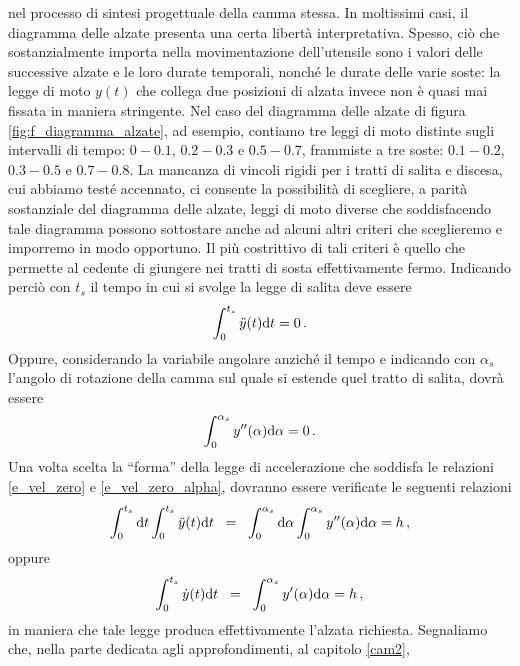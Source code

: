 nel processo di sintesi progettuale della camma stessa.
In moltissimi casi, il diagramma delle alzate presenta una certa libert\`a interpretativa.
Spesso, ci\`o che sostanzialmente importa nella movimentazione dell'utensile
sono i valori delle successive alzate e le loro durate temporali, nonch\'e le
durate delle varie soste:
la legge di moto $y(t)$ che collega 
due posizioni di alzata invece non \`e quasi mai fissata in maniera stringente.
Nel caso del diagramma delle alzate di figura \ref{fig:f_diagramma_alzate}, ad esempio,
contiamo tre leggi di moto distinte sugli intervalli di tempo:
$0-0.1$, $0.2-0.3$ e $0.5-0.7$, frammiste a tre 
soste: $0.1-0.2$, $0.3-0.5$ e $0.7-0.8$. 
La mancanza di vincoli rigidi per i tratti di salita e discesa, cui abbiamo test\'e accennato, ci consente  la possibilit\`a di scegliere, a parit\`a
 sostanziale del
diagramma delle alzate, leggi di moto diverse che soddisfacendo tale diagramma 
possono sottostare anche ad alcuni altri criteri che sceglieremo e imporremo in
modo opportuno. Il pi\`u costrittivo di tali criteri \`e quello che permette
al cedente di giungere nei tratti di sosta effettivamente fermo. Indicando 
perci\`o con $t_s$ il tempo in cui si svolge la legge di salita deve 
essere
\begin{equation}
\int_0^{t_s} \ddot y(t) {\rm d}t=0\,.
\label{e_vel_zero}
\end{equation}
\noindent Oppure, considerando la variabile angolare anzich\'e il tempo e
indicando con $\alpha_s$ l'angolo di rotazione della camma
sul quale si estende quel tratto di salita, dovr\`a essere
\begin{equation}
\int_0^{\alpha_s}  y''(\alpha) {\rm d}\alpha=0\,.
\label{e_vel_zero_alpha}
\end{equation}
\noindent Una volta scelta la ``forma'' della
legge di accelerazione che soddisfa le relazioni \ref{e_vel_zero} e
\ref{e_vel_zero_alpha}, dovranno essere verificate le seguenti relazioni
\begin{equation}
\int_0^{t_s} {\rm d}t\int_0^{t_s} \ddot y(t) {\rm d}t\;\;=\;\;
\int_0^{\alpha_s} {\rm d}\alpha\int_0^{\alpha_s} y''(\alpha) {\rm d}\alpha=h\,,
\label{eq:ha}
\end{equation}
\noindent oppure
\begin{equation}
\int_0^{t_s} \dot y(t) {\rm d}t\;\;=\;\;
\int_0^{\alpha_s} y'(\alpha) {\rm d}\alpha=h\,,
\label{eq:hv}
\end{equation}
\noindent in maniera che tale legge produca effettivamente l'alzata richiesta.
Segnaliamo che,
nella parte dedicata agli approfondimenti, al capitolo \ref{cam2},

